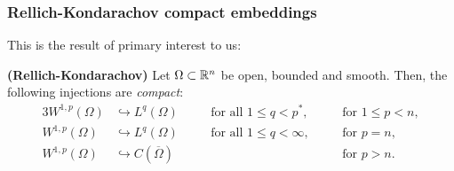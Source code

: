 \subsubsection{Rellich-Kondarachov compact embeddings}
This is the result of primary interest to us:
\begin{theorem}\label{thm:rellich}
    \textbf{(Rellich-Kondarachov)} Let $\Omega\subset \mathbb{R}^n$ be open, bounded and smooth. Then, the following injections are \emph{compact}: 
    \begin{alignat*}{3}
W^{1,p}(\Omega) &\hookrightarrow L^q(\Omega) &\quad& \text{for all } 1\leq q<p^*, &\quad& \text{for } 1\leq p<n,\\
W^{1,p}(\Omega) &\hookrightarrow L^q(\Omega) &\quad& \text{for all } 1\leq q<\infty, &\quad& \text{for } p=n,\\
W^{1,p}(\Omega) &\hookrightarrow C(\overline\Omega) &\quad& &\quad& \text{for } p>n.
\end{alignat*}
\end{theorem}

